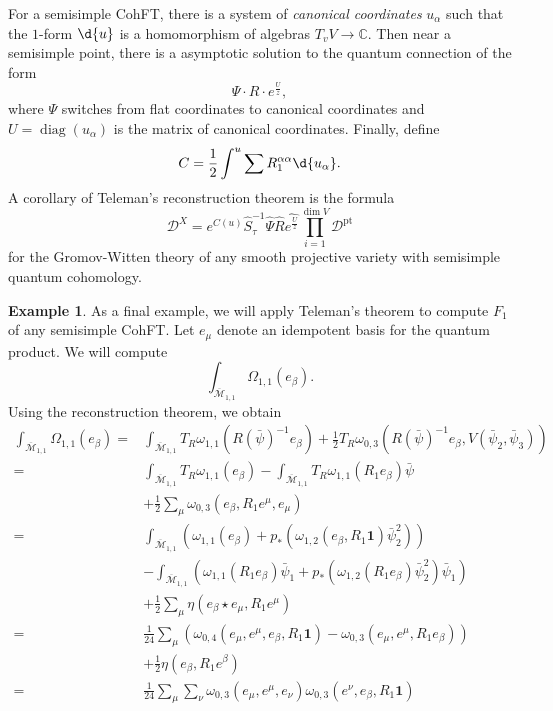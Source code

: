 \documentclass{amsart}
\theoremstyle{definition}
\newtheorem{exm}[thm]{Example}
\theoremstyle{remark}
\theoremstyle{plain}
\theoremstyle{definition}
\theoremstyle{remark}
\newcommand{\C}{\mathbb{C}}
\newcommand{\Mbar}{\overline{\mathcal{M}}}
\newcommand{\mc}[1]{\mathcal{#1}}
\newcommand{\mr}[1]{\mathrm{#1}}
\newcommand{\on}[1]{\operatorname{#1}}
\newcommand{\wh}[1]{\widehat{#1}}
\newcommand{\1}{\mathbf{1}}
\newcommand{\2}{\mathbf{2}}
\newcommand{\3}{\mathbf{3}}
\begin{document}
For a semisimple CohFT, there is a system of \textit{canonical coordinates} $u_{\alpha}$ such that the $1$-form $\d{u}$ is a homomorphism of algebras $T_v V \to \C$. Then near a semisimple point, there is a asymptotic solution to the quantum connection of the form
\[ \Psi \cdot  R \cdot e^{\frac{U}{z}}, \]
where $\Psi$ switches from flat coordinates to canonical coordinates and $U = \on{diag}(u_{\alpha})$ is the matrix of canonical coordinates. Finally, define
\[ C = \frac{1}{2} \int^u \sum R_1^{\alpha\alpha} \d{u_{\alpha}}. \]
A corollary of Teleman's reconstruction theorem is the formula
\[ \mc{D}^X = e^{C(u)} \hat{S}^{-1}_{\tau} \hat{\Psi} \hat{R} \wh{e^{\frac{U}{z}}} \prod_{i=1}^{\dim V} \mc{D}^{\mr{pt}} \]
for the Gromov-Witten theory of any smooth projective variety with semisimple quantum cohomology.

\begin{exm}
    As a final example, we will apply Teleman's theorem to compute $F_1$ of any semisimple CohFT. Let $e_{\mu}$ denote an idempotent basis for the quantum product. We will compute
    \[ \int_{\Mbar_{1,1}} \Omega_{1,1}(e_{\beta}). \]
    Using the reconstruction theorem, we obtain
    \begin{align*}
        \int_{\Mbar_{1,1}}\Omega_{1,1}(e_{\beta}) ={}& \int_{\Mbar_{1,1}} T_R \omega_{1,1}(R(\bar{\psi})^{-1} e_{\beta}) + \frac{1}{2} T_R \omega_{0,3}(R(\bar{\psi})^{-1} e_{\beta}, V(\bar{\psi}_2, \bar{\psi}_3)) \\
        ={}& \int_{\Mbar_{1,1}}T_R\omega_{1,1}(e_{\beta}) - \int_{\Mbar_{1,1}} T_R \omega_{1,1}(R_1 e_{\beta})\bar{\psi} \\ 
        &+ \frac{1}{2}\sum_{\mu}  \omega_{0,3}(e_{\beta}, R_1 e^{\mu}, e_{\mu}) \\
        ={}& \int_{\Mbar_{1,1}} ( \omega_{1,1}(e_{\beta}) + p_* ( \omega_{1,2}(e_{\beta}, R_1 \1) \bar{\psi}_2^2 )) \\
        &- \int_{\Mbar_{1,1}} (\omega_{1,1}(R_1 e_{\beta})\bar{\psi}_1 + p_* ( \omega_{1,2}(R_1 e_{\beta}) \bar{\psi}_2^2 ) \bar{\psi}_1) \\
        &+ \frac{1}{2} \sum_{\mu} \eta(e_{\beta} \star e_{\mu}, R_1 e^{\mu}) \\
        ={}& \frac{1}{24} \sum_{\mu} ( \omega_{0,4}(e_{\mu}, e^{\mu}, e_{\beta}, R_1 \1) -\omega_{0,3}(e_{\mu}, e^{\mu}, R_1 e_{\beta}) )\\
        &+ \frac{1}{2} \eta(e_{\beta}, R_1 e^{\beta}) \\
        ={}& \frac{1}{24} \sum_{\mu}\sum_{\nu} \omega_{0,3}(e_{\mu}, e^{\mu}, e_{\nu})\omega_{0,3}(e^{\nu}, e_{\beta}, R_1 \1) \\

\end{align*}
\end{exm}
\end{document}
